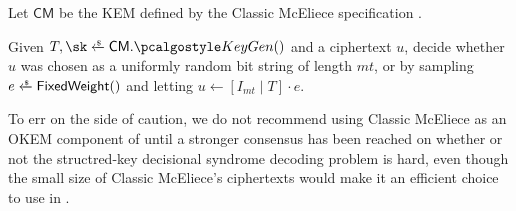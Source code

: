 \begin{definition}
\label{def:classic-mceliece-alt-assump}
    Let $\mathsf{CM}$ be the KEM defined by the Classic McEliece specification \cite{NISTPQC-R4:ClassicMcEliece22}.
    
    Given $T, \sk \getsr \mathsf{CM}.\kgen()$ and a ciphertext $u$, decide whether $u$ was chosen as a uniformly random bit string of length $mt$, or by sampling $e \getsr \mathsf{FixedWeight}()$ and letting $u \gets \left[ I_{mt} \mid T \right] \cdot e$.
\end{definition}

To err on the side of caution, we do not recommend using Classic McEliece as an OKEM component of \drivel{} until a stronger consensus has been reached on whether or not the structred-key decisional syndrome decoding problem is hard, even though the small size of Classic McEliece's ciphertexts would make it an efficient choice to use in \drivel{}.
